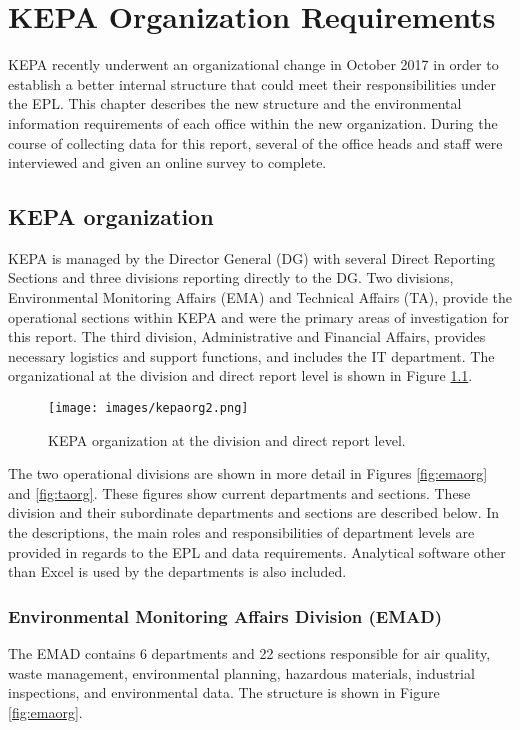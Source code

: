 \chapter{KEPA Organization Requirements}

KEPA recently underwent an organizational change in October 2017 in order to establish a better internal structure that could meet their responsibilities under the EPL. This chapter describes the new structure and the environmental information requirements of each office within the new organization.  During the course of collecting data for this report, several of the office heads and staff were interviewed and given an online survey to complete. 

\section{KEPA organization}

KEPA is managed by the Director General (DG) with several Direct Reporting Sections and three divisions reporting directly to the DG. Two divisions, Environmental Monitoring Affairs (EMA) and Technical Affairs (TA), provide the operational sections within KEPA and were the primary areas of investigation for this report. The third division, Administrative and Financial Affairs, provides necessary logistics and support functions, and includes the IT department. The organizational at the division and direct report level is shown in Figure \ref{fig:kepaorg}. 

%
\begin{figure}[H]
\centering
\texttt{[image: images/kepaorg2.png]} 
\caption{KEPA organization at the division and direct report level.}
\label{fig:kepaorg}
\end{figure}
%

The two operational divisions are shown in more detail in Figures \ref{fig:emaorg} and \ref{fig:taorg}. These figures show current departments and sections. These division and their subordinate departments and sections are described below. In the descriptions, the main roles and responsibilities of department levels are provided in regards to the EPL and data requirements.  Analytical software other than Excel is used by the departments is also included.

\subsection{Environmental Monitoring Affairs Division (EMAD)}
The EMAD contains 6 departments and 22 sections  responsible for air quality, waste management, environmental planning, hazardous materials, industrial inspections, and environmental data.  The structure is shown in  Figure \ref{fig:emaorg}.

